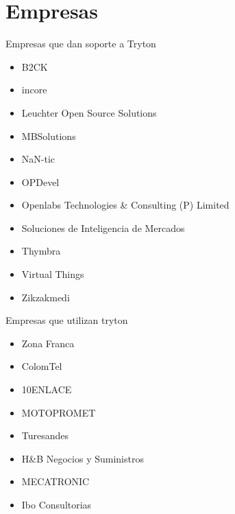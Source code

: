
\section{Empresas}


	\begin{frame}{Empresas que dan soporte a Tryton}
		\begin{itemize}
			\item B2CK
			\item incore
			\item Leuchter Open Source Solutions
			\item MBSolutions
			\item NaN-tic
			\item OPDevel
			\item Openlabs Technologies  \& Consulting (P) Limited
			\item Soluciones de Inteligencia de Mercados
			\item Thymbra
			\item Virtual Things
			\item Zikzakmedi
		\end{itemize}
	\end{frame}



	\begin{frame}{Empresas que utilizan tryton}
		\begin{itemize}
			\item Zona Franca
			\item ColomTel
			\item 10ENLACE
			\item MOTOPROMET
			\item Turesandes
			\item H\&B Negocios y Suministros
			\item MECATRONIC
			\item Ibo Consultorias
		\end{itemize}
	\end{frame}



